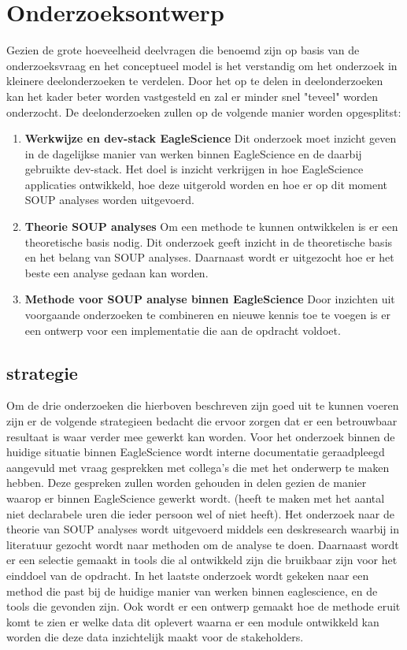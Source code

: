 \section{Onderzoeksontwerp}\label{sec:onderzoeksontwerp}
Gezien de grote hoeveelheid deelvragen die benoemd zijn op basis van de onderzoeksvraag en het conceptueel model is het verstandig om het onderzoek in kleinere deelonderzoeken te verdelen. Door het op te delen in deelonderzoeken kan het kader beter worden vastgesteld en zal er minder snel "teveel" worden onderzocht. De deelonderzoeken zullen op de volgende manier worden opgesplitst:
\begin{enumerate}
    \item \textbf{Werkwijze en dev-stack EagleScience} Dit onderzoek moet inzicht geven in de dagelijkse manier van werken binnen EagleScience en de daarbij gebruikte dev-stack. Het doel is inzicht verkrijgen in hoe EagleScience applicaties ontwikkeld, hoe deze uitgerold worden en hoe er op dit moment SOUP analyses worden uitgevoerd.
    \item \textbf{Theorie SOUP analyses} Om een methode te kunnen ontwikkelen is er een theoretische basis nodig. Dit onderzoek geeft inzicht in de theoretische basis en het belang van SOUP analyses. Daarnaast wordt er uitgezocht hoe er het beste een analyse gedaan kan worden.
    \item \textbf{Methode voor SOUP analyse binnen EagleScience} Door inzichten uit voorgaande onderzoeken te combineren en nieuwe kennis toe te voegen is er een ontwerp voor een implementatie die aan de opdracht voldoet.
\end{enumerate}

\subsection{strategie}\label{subsec:opstrategie}
Om de drie onderzoeken die hierboven beschreven zijn goed uit te kunnen voeren zijn er de volgende strategieen bedacht die ervoor zorgen dat er een betrouwbaar resultaat is waar verder mee gewerkt kan worden.
Voor het onderzoek binnen de huidige situatie binnen EagleScience wordt interne documentatie geraadpleegd aangevuld met vraag gesprekken met collega's die met het onderwerp te maken hebben. Deze gespreken zullen worden gehouden in delen gezien de manier waarop er binnen EagleScience gewerkt wordt. (heeft te maken met het aantal niet declarabele uren die ieder persoon wel of niet heeft). Het onderzoek naar de theorie van SOUP analyses wordt uitgevoerd middels een deskresearch waarbij in literatuur gezocht wordt naar methoden om de analyse te doen. Daarnaast wordt er een selectie gemaakt in tools die al ontwikkeld zijn die bruikbaar zijn voor het einddoel van de opdracht. In het laatste onderzoek wordt gekeken naar een method die past bij de huidige manier van werken binnen eaglescience, en de tools die gevonden zijn. Ook wordt er een ontwerp gemaakt hoe de methode eruit komt te zien er welke data dit oplevert waarna er een module ontwikkeld kan worden die deze data inzichtelijk maakt voor de stakeholders.


